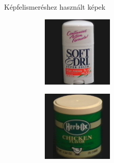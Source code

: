\documentclass{beamer}
\begin{document}
\begin{frame}{Képfelismeréshez használt képek}
\begin{figure}
\begin{subfigure}{55pt}
        \end{subfigure}
        \begin{subfigure}{55pt}
            \centering
        \includegraphics[width=\textwidth]{figures/coil_original/22.png}
        
        \end{subfigure}
        \begin{subfigure}{55pt}
            \centering
        \includegraphics[width=\textwidth]{figures/coil_original/26.png}
        

\end{subfigure}
\end{figure}
\end{frame}
\end{document}
